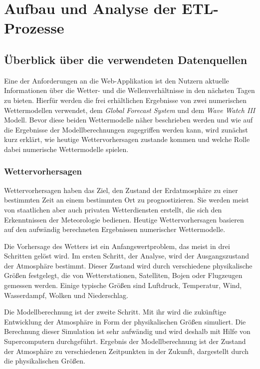 \chapter{Aufbau und Analyse der ETL-Prozesse}

\section{Überblick über die verwendeten Datenquellen}
Eine der Anforderungen an die Web-Applikation ist den Nutzern aktuelle
Informationen über die Wetter- und die Wellenverhältnisse in den
nächsten Tagen zu bieten. Hierfür werden die frei erhältlichen
Ergebnisse von zwei numerischen Wettermodellen verwendet, dem
\textit{Global Forecast System} und dem \textit{Wave Watch III}
Modell. Bevor diese beiden Wettermodelle näher beschrieben werden und
wie auf die Ergebnisse der Modellberechnungen zugegriffen werden kann,
wird zunächst kurz erklärt, wie heutige Wettervorhersagen zustande
kommen und welche Rolle dabei numerische Wettermodelle spielen.

\subsection{Wettervorhersagen}
Wettervorhersagen haben das Ziel, den Zustand der Erdatmosphäre zu
einer bestimmten Zeit an einem bestimmten Ort zu prognostizieren. Sie
werden meist von staatlichen aber auch privaten Wetterdiensten
erstellt, die sich den Erkenntnissen der Meteorologie
bedienen. Heutige Wettervorhersagen basieren auf den aufwändig
berechneten Ergebnissen numerischer Wettermodelle.

Die Vorhersage des Wetters ist ein Anfangswertproblem, das meist in
drei Schritten gelöst wird. Im ersten Schritt, der Analyse, wird der
Ausgangszustand der Atmosphäre bestimmt. Dieser Zustand wird durch
verschiedene physikalische Größen festgelegt, die von Wetterstationen,
Satelliten, Bojen oder Flugzeugen gemessen werden. Einige typische
Größen sind Luftdruck, Temperatur, Wind, Wasserdampf, Wolken und
Niederschlag.

Die Modellberechnung ist der zweite Schritt. Mit ihr wird die
zukünftige Entwicklung der Atmosphäre in Form der physikalischen
Größen simuliert. Die Berechnung dieser Simulation ist sehr aufwändig
und wird deshalb mit Hilfe von Supercomputern durchgeführt. Ergebnis
der Modellberechnung ist der Zustand der Atmosphäre zu verschiedenen
Zeitpunkten in der Zukunft, dargestellt durch die physikalischen
Größen.

